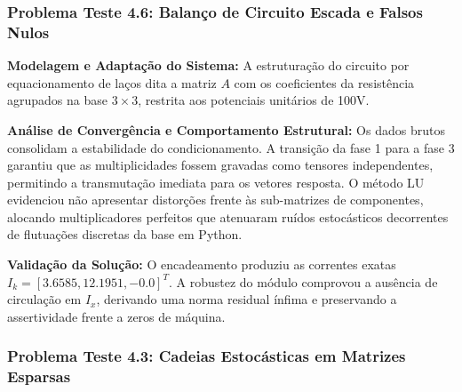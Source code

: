 \subsubsection{Problema Teste 4.6: Balanço de Circuito Escada e Falsos Nulos}

\textbf{Modelagem e Adaptação do Sistema:} A estruturação do circuito por equacionamento de laços dita a matriz $A$ com os coeficientes da resistência agrupados na base $3 \times 3$, restrita aos potenciais unitários de 100V.

\begin{table}[H]
\centering
\caption{Avaliação da Decomposição do Circuito (Problema 4.6 - LU)}
\label{tab:lu_prob46}
\end{table}

\textbf{Análise de Convergência e Comportamento Estrutural:} Os dados brutos consolidam a estabilidade do condicionamento. A transição da fase 1 para a fase 3 garantiu que as multiplicidades fossem gravadas como tensores independentes, permitindo a transmutação imediata para os vetores resposta. O método LU evidenciou não apresentar distorções frente às sub-matrizes de componentes, alocando multiplicadores perfeitos que atenuaram ruídos estocásticos decorrentes de flutuações discretas da base em Python.

\textbf{Validação da Solução:} O encadeamento produziu as correntes exatas $I_k =[3.6585, 12.1951, -0.0]^T$. A robustez do módulo comprovou a ausência de circulação em $I_x$, derivando uma norma residual ínfima e preservando a assertividade frente a zeros de máquina.

\subsubsection{Problema Teste 4.3: Cadeias Estocásticas em Matrizes Esparsas}


